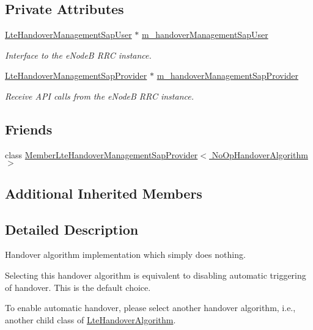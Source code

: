\subsection*{Private Attributes}
\begin{DoxyCompactItemize}
\item 
\hyperlink{classns3_1_1LteHandoverManagementSapUser}{Lte\+Handover\+Management\+Sap\+User} $\ast$ \hyperlink{classns3_1_1NoOpHandoverAlgorithm_aac1dfb01c1f8bdf46f16b3fe5eec6a1d}{m\+\_\+handover\+Management\+Sap\+User}
\begin{DoxyCompactList}\small\item\em Interface to the e\+NodeB R\+RC instance. \end{DoxyCompactList}\item 
\hyperlink{classns3_1_1LteHandoverManagementSapProvider}{Lte\+Handover\+Management\+Sap\+Provider} $\ast$ \hyperlink{classns3_1_1NoOpHandoverAlgorithm_a7cdea317d0f26f7fe98418cb31ac72ab}{m\+\_\+handover\+Management\+Sap\+Provider}
\begin{DoxyCompactList}\small\item\em Receive A\+PI calls from the e\+NodeB R\+RC instance. \end{DoxyCompactList}\end{DoxyCompactItemize}
\subsection*{Friends}
\begin{DoxyCompactItemize}
\item 
class \hyperlink{classns3_1_1NoOpHandoverAlgorithm_a981ac2ca113b0e0d74eff13f934bd6be}{Member\+Lte\+Handover\+Management\+Sap\+Provider$<$ No\+Op\+Handover\+Algorithm $>$}
\end{DoxyCompactItemize}
\subsection*{Additional Inherited Members}


\subsection{Detailed Description}
Handover algorithm implementation which simply does nothing. 

Selecting this handover algorithm is equivalent to disabling automatic triggering of handover. This is the default choice.

To enable automatic handover, please select another handover algorithm, i.\+e., another child class of \hyperlink{classns3_1_1LteHandoverAlgorithm}{Lte\+Handover\+Algorithm}. 

